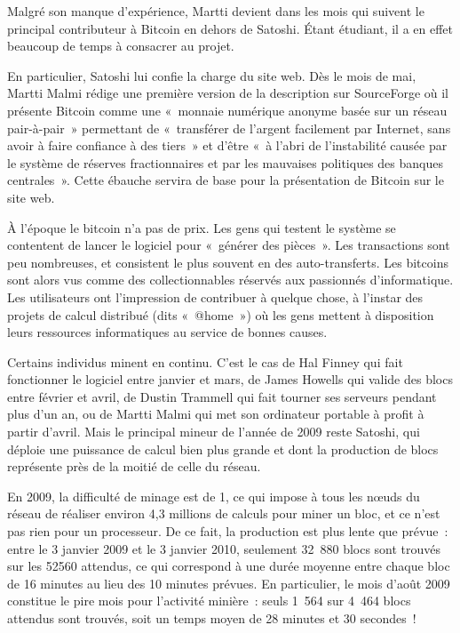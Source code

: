Malgré son manque d'expérience, Martti devient dans les mois qui suivent le principal contributeur à Bitcoin en dehors de Satoshi. Étant étudiant, il a en effet beaucoup de temps à consacrer au projet.

En particulier, Satoshi lui confie la charge du site web. Dès le mois de mai, Martti Malmi rédige une première version de la description sur SourceForge où il présente Bitcoin comme une «~monnaie numérique anonyme basée sur un réseau pair-à-pair~» permettant de «~transférer de l'argent facilement par Internet, sans avoir à faire confiance à des tiers~» et d'être «~à l'abri de l'instabilité causée par le système de réserves fractionnaires et par les mauvaises politiques des banques centrales~». Cette ébauche servira de base pour la présentation de Bitcoin sur le site web.


À l'époque le bitcoin n'a pas de prix. Les gens qui testent le système se contentent de lancer le logiciel pour «~générer des pièces~». Les transactions sont peu nombreuses, et consistent le plus souvent en des auto-transferts. Les bitcoins sont alors vus comme des collectionnables réservés aux passionnés d'informatique. Les utilisateurs ont l'impression de contribuer à quelque chose, à l'instar des projets de calcul distribué (dits «~@home~») où les gens mettent à disposition leurs ressources informatiques au service de bonnes causes.

Certains individus minent en continu. C'est le cas de Hal Finney qui fait fonctionner le logiciel entre janvier et mars, de James Howells qui valide des blocs entre février et avril, de Dustin Trammell qui fait tourner ses serveurs pendant plus d'un an, ou de Martti Malmi qui met son ordinateur portable à profit à partir d'avril. Mais le principal mineur de l'année de 2009 reste Satoshi, qui déploie une puissance de calcul bien plus grande et dont la production de blocs représente près de la moitié de celle du réseau.

En 2009, la difficulté de minage est de 1, ce qui impose à tous les nœuds du réseau de réaliser environ 4,3 millions de calculs pour miner un bloc, et ce n'est pas rien pour un processeur. De ce fait, la production est plus lente que prévue~: entre le 3 janvier 2009 et le 3 janvier 2010, seulement 32~880 blocs sont trouvés sur les 52560 attendus, ce qui correspond à une durée moyenne entre chaque bloc de 16 minutes au lieu des 10 minutes prévues. En particulier, le mois d'août 2009 constitue le pire mois pour l'activité minière~: seuls 1~564 sur 4~464 blocs attendus sont trouvés, soit un temps moyen de 28 minutes et 30 secondes~!

